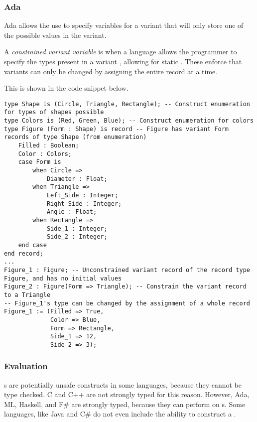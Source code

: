 \subsubsection{Ada }\label{subsubsec:Ada_Union_Types}
Ada allows the use to specify variables for a variant  that will only store one of the possible  values in the variant.

\begin{definition}\label{def:Union_Type-Constrained_Variant_Variable}
  A \emph{constrained variant variable} is when a language allows the programmer to specify the types present in a variant , allowing for static .
  These enforce that variants can only be changed by assigning the entire record at a time.

  This is shown in the code snippet below.
\begin{verbatim}
type Shape is (Circle, Triangle, Rectangle); -- Construct enumeration for types of shapes possible
type Colors is (Red, Green, Blue); -- Construct enumeration for colors
type Figure (Form : Shape) is record -- Figure has variant Form records of type Shape (from enumeration)
    Filled : Boolean;
    Color : Colors;
    case Form is
        when Circle =>
            Diameter : Float;
        when Triangle =>
            Left_Side : Integer;
            Right_Side : Integer;
            Angle : Float;
        when Rectangle =>
            Side_1 : Integer;
            Side_2 : Integer;
    end case
end record;
...
Figure_1 : Figure; -- Unconstrained variant record of the record type Figure, and has no initial values
Figure_2 : Figure(Form => Triangle); -- Constrain the variant record to a Triangle
-- Figure_1's type can be changed by the assignment of a whole record
Figure_1 := (Filled => True,
             Color => Blue,
             Form => Rectangle,
             Side_1 => 12,
             Side_2 => 3);
\end{verbatim}
\end{definition}

\subsubsection{Evaluation}\label{subsubsec:Union_Types-Evaluation}
s are potentially unsafe constructs in some languages, because they cannot be type checked.
C and C++ are not strongly typed for this reason.
However, Ada, ML, Haskell, and F\# are strongly typed, because they can perform  on s.
Some languages, like Java and C\# do not even include the ability to construct a .


